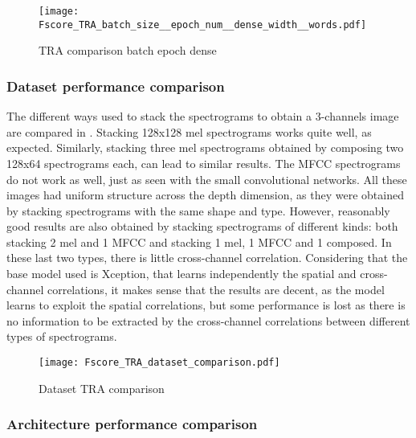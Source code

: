 
\begin{figure}[h!]
    \centering
    \texttt{[image: Fscore\_TRA\_batch\_size\_\_epoch\_num\_\_dense\_width\_\_words.pdf]}
    \caption{TRA comparison batch epoch dense}%
    \label{fig:tra_comparison_batch_epoch_dense}
\end{figure}

\subsubsection{Dataset performance comparison}



The different ways used to stack the spectrograms to obtain a 3-channels image
are compared in .
Stacking 128x128 mel spectrograms works quite well, as expected.
Similarly, stacking three mel spectrograms obtained by composing two 128x64
spectrograms each, can lead to similar results.
The MFCC spectrograms do not work as well, just as seen with the small
convolutional networks.
All these images had uniform structure across the depth dimension, as they were
obtained by stacking spectrograms with the same shape and type.
However, reasonably good results are also obtained by stacking spectrograms of
different kinds: both stacking 2 mel and 1 MFCC and stacking 1 mel, 1 MFCC and
1 composed.
In these last two types, there is little cross-channel correlation.
Considering that the base model used is Xception, that learns independently the
spatial and cross-channel correlations, it makes sense that the results are
decent, as the model learns to exploit the spatial correlations, but some
performance is lost as there is no information to be extracted by the
cross-channel correlations between different types of spectrograms.

\begin{figure}[h!]
    \centering
    \texttt{[image: Fscore\_TRA\_dataset\_comparison.pdf]}
    \caption{Dataset TRA comparison}%
    \label{fig:tra_comparison_dataset}
\end{figure}

\subsubsection{Architecture performance comparison}


